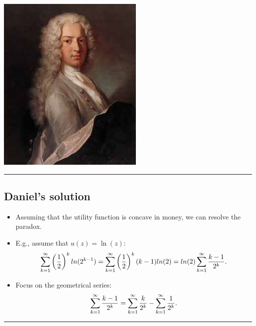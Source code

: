 \documentclass[
  letterpaper,
  DIV=11,
  numbers=noendperiod]{scrartcl}
\providecommand{\tightlist}{%
  \setlength{\itemsep}{0pt}\setlength{\parskip}{0pt}}\usepackage{longtable,booktabs,array}
\begin{document}
\includegraphics[width=0.8\linewidth,height=\textheight,keepaspectratio]{figures/DBernoulli.jpg}

\begin{center}\rule{0.5\linewidth}{0.5pt}\end{center}

\subsection{Daniel's solution}\label{daniels-solution}

\begin{itemize}
\tightlist
\item
  Assuming that the utility function is concave in money, we can resolve
  the paradox.
\item
  E.g., assume that \(u(z) = \ln(z)\): \[\small
      \sum_{k=1}^{\infty}\left(\frac{1}{2}\right)^k ln(2^{k-1}) = \sum_{k=1}^{\infty}\left(\frac{1}{2}\right)^k (k-1)ln(2) = ln(2)\sum_{k=1}^{\infty}\frac{k-1}{2^k}.
  \]
\item
  Focus on the geometrical series: \[\small
    \sum_{k=1}^{\infty}\frac{k-1}{2^k} = \sum_{k=1}^{\infty}\frac{k}{2^k} - \sum_{k=1}^{\infty}\frac{1}{2^k}.
  \]
\end{itemize}

\begin{center}\rule{0.5\linewidth}{0.5pt}\end{center}
\end{document}
